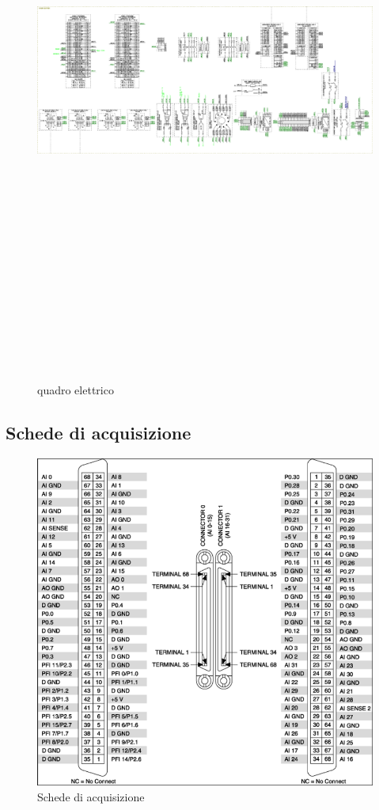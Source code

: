 \documentclass{article}
\begin{document}
\begin{figure}[H]
\centering
\includegraphics[width=12cm,height=20cm,keepaspectratio]{./simulink_real/quadro.png}
\caption{ quadro elettrico}
\end{figure}


\subsection{Schede di acquisizione}

\begin{figure}[H]
\centering
\includegraphics[width=.6\textwidth]{./simulink_real/NI6229.png}
\caption{ Schede di acquisizione}
\end{figure}
\end{document}
